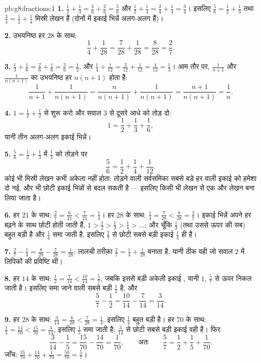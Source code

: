 \begin{solution}{pb:g8:fractions:1}
\textbf{1.} $\frac12 + \frac13 = \frac36 + \frac26 = \frac56$ और
$\frac12 + \frac14 = \frac24 + \frac14 = \frac34$। इसलिए
$\frac56 = \frac12 + \frac13$ तथा $\frac34 = \frac12 + \frac14$
मिस्री लेखन हैं (दोनों में इकाई भिन्नें अलग-अलग हैं)।

\textbf{2.} उभयनिष्ठ हर $28$ के साथ:
\[
\frac14 + \frac{1}{28} = \frac{7}{28} + \frac{1}{28}
= \frac{8}{28} = \frac{2}{7} .
\]

\textbf{3.} $\frac13 + \frac16 = \frac26 + \frac16 = \frac36 =
\frac12$, और $\frac14 + \frac{1}{12} = \frac{3}{12} +
\frac{1}{12} = \frac{4}{12} = \frac13$। आम तौर पर,
$\frac{1}{n+1}$ और $\frac{1}{n(n+1)}$ का उभयनिष्ठ हर $n(n+1)$
होता है:
\[
\frac{1}{n+1} + \frac{1}{n(n+1)}
= \frac{n}{n(n+1)} + \frac{1}{n(n+1)}
= \frac{n+1}{n(n+1)}
= \frac{1}{n} .
\]

\textbf{4.} $1 = \frac12 + \frac12$ से शुरू करो और सवाल 3 से दूसरे
आधे को तोड़ दो:
\[
1 = \frac12 + \frac13 + \frac16 ,
\]
यानी तीन अलग-अलग इकाई भिन्नें।

\textbf{5.} $\frac56 = \frac12 + \frac13$ में $\frac13$ को तोड़ने
पर
\[
\frac56 = \frac12 + \frac14 + \frac{1}{12} .
\]
कोई भी मिस्री लेखन कभी अकेला नहीं होता: तोड़ने वाली सर्वसमिका सबसे
बड़े हर वाली इकाई  को हमेशा दो नई, और भी छोटी इकाई भिन्नों से
बदल सकती है --- इसलिए किसी भी लेखन से एक और लेखन बना लिया जाता है।

\textbf{6.} हर $21$ के साथ: $\frac27 = \frac{6}{21} <
\frac{7}{21} = \frac13$। हर $28$ के साथ: $\frac14 =
\frac{7}{28} < \frac{8}{28} = \frac27$। इकाई भिन्नें अपने हर बढ़ने
के साथ छोटी होती जाती हैं, $1 > \frac12 > \frac13 > \frac14 >
\dots$; और चूँकि $\frac13$ (तथा उससे ऊपर की सब) बहुत बड़ी है और
$\frac14$ समा जाती है, इसलिए $\frac27$ से छोटी सबसे बड़ी इकाई 
$\frac14$ ही है।

\textbf{7.} $\frac27 - \frac14 = \frac{8}{28} - \frac{7}{28} =
\frac{1}{28}$: लालची तरीक़ा $\frac27 = \frac14 + \frac{1}{28}$
बनाता है, यानी ठीक वही जो सवाल 2 में लिपिकों की प्रविष्टि थी।

\textbf{8.} हर $14$ के साथ: $\frac12 = \frac{7}{14} <
\frac{10}{14} = \frac57$, जबकि इससे बड़ी अकेली इकाई , यानी
$1$, $\frac57$ से ऊपर निकल जाती है। इसलिए समा जाने वाली सबसे बड़ी
$\frac12$ है, और
\[
\frac57 - \frac12 = \frac{10}{14} - \frac{7}{14} = \frac{3}{14} .
\]

\textbf{9.} हर $28$ के साथ: $\frac{3}{14} = \frac{6}{28} <
\frac{7}{28} = \frac14$, इसलिए $\frac14$ बहुत बड़ी है। हर $70$ के
साथ: $\frac15 = \frac{14}{70} < \frac{15}{70} = \frac{3}{14}$,
इसलिए $\frac15$ समा जाती है: $\frac{3}{14}$ से छोटी सबसे बड़ी इकाई
 वही है। फिर
\[
\frac{3}{14} - \frac15 = \frac{15}{70} - \frac{14}{70}
= \frac{1}{70},
\qquad\text{अतः}\qquad
\frac57 = \frac12 + \frac15 + \frac{1}{70} .
\]
जाँच: $\frac{35}{70} + \frac{14}{70} + \frac{1}{70} =
\frac{50}{70} = \frac57$।


\end{solution}

